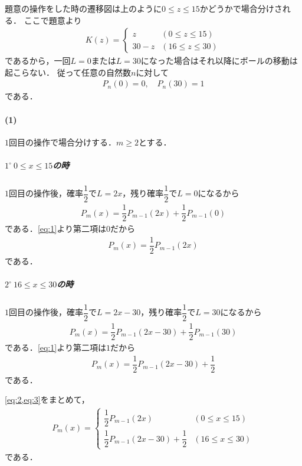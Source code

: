 \documentclass[../../main.tex]{subfiles}
\begin{document}
題意の操作をした時の遷移図は上のように$0 \le z \le 15$かどうかで場合分けされる．
ここで題意より
\begin{align}
  K(z) =
  \begin{cases}
    z    & (0 \le z \le 15) \\
    30-z & (16 \le z \le 30)
  \end{cases}
\end{align}
であるから，一回$L=0$または$L=30$になった場合はそれ以降にボールの移動は起こらない．
従って任意の自然数$n$に対して
\begin{align}
  P_n(0) = 0, \quad P_n(30) = 1 \label{eq:1}
\end{align}
である．

\paragraph{(1)}

$1$回目の操作で場合分けする．$m \ge 2$とする．

\subparagraph{$1^\circ \ 0 \le x \le 15$の時}

$1$回目の操作後，確率$\dfrac{1}{2}$で$L=2x$，残り確率$\dfrac{1}{2}$で$L=0$になるから
\begin{align}
  P_m(x) = \dfrac{1}{2} P_{m-1}(2x) + \dfrac{1}{2} P_{m-1}(0)
\end{align}
である．\cref{eq:1}より第二項は$0$だから
\begin{align}
  P_m(x) = \dfrac{1}{2} P_{m-1}(2x) \label{eq:2}
\end{align}
である．

\subparagraph{$2^\circ \ 16 \le x \le 30$の時}

$1$回目の操作後，確率$\dfrac{1}{2}$で$L=2x-30$，残り確率$\dfrac{1}{2}$で$L=30$になるから
\begin{align}
  P_m(x) = \dfrac{1}{2} P_{m-1}(2x-30) + \dfrac{1}{2} P_{m-1}(30)
\end{align}
である．\cref{eq:1}より第二項は$1$だから
\begin{align}
  P_m(x) = \dfrac{1}{2} P_{m-1}(2x-30) + \dfrac{1}{2} \label{eq:3}
\end{align}
である．
\casesend

\cref{eq:2,eq:3}をまとめて，
\begin{align}
  P_m(x) =
  \begin{cases}
    \dfrac{1}{2} P_{m-1}(2x) & (0 \le x \le 15) \\
    \dfrac{1}{2} P_{m-1}(2x-30) + \dfrac{1}{2} & (16 \le x \le 30)
  \end{cases} \label{eq:4}
\end{align}
である．
\end{document}
